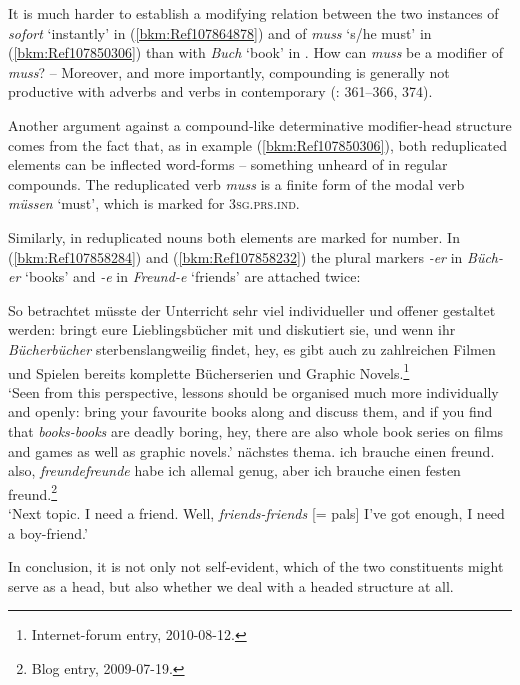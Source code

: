\documentclass[output=paper
  ,nobabel
  ,draftmode
  ,colorlinks, citecolor=brown
]{langscibook}
\begin{document}
\noindent
It is much harder to establish a modifying relation between the two instances of \emph{sofort}
`instantly' in (\ref{bkm:Ref107864878}) and of \emph{muss} `s/he must' in (\ref{bkm:Ref107850306})
than with \emph{Buch} `book' in . How can \emph{muss} be a modifier of \emph{muss}?
– Moreover, and more importantly, compounding is generally not productive with adverbs and verbs
in contemporary  (\citealt{FleischerBarz2012}: 361–366, 374).

Another argument against a compound-like determinative modifier-head structure comes from the fact
that, as in example (\ref{bkm:Ref107850306}), both reduplicated elements can be inflected word-forms
– something unheard of in regular compounds. The reduplicated verb \emph{muss} is a finite form of
the modal verb \emph{müssen} `must', which is marked for 3\textsc{sg.prs.ind}.

Similarly, in reduplicated nouns both elements are marked for number. In (\ref{bkm:Ref107858284})
and (\ref{bkm:Ref107858232}) the plural markers \emph{-er} in \emph{Büch-er} `books' and
\emph{-e} in \emph{Freund-e} `friends' are attached twice:



\ea
\label{bkm:Ref107858284}%
So betrachtet müsste der Unterricht sehr viel individueller und offener gestaltet werden: bringt eure Lieblingsbücher mit und diskutiert sie, und wenn ihr \emph{Bücherbücher} sterbenslangweilig findet, hey, es gibt auch zu zahlreichen Filmen und Spielen bereits komplette Bücherserien und Graphic Novels.\footnote{Internet-forum entry, 2010-08-12.}\\
`Seen from this perspective, lessons should be organised much more individually and openly: bring your favourite books along and discuss them, and if you find that \emph{books-books} are deadly boring, hey, there are also whole book series on films and games as well as graphic novels.'
\z
\ea
\label{bkm:Ref107858232}%
nächstes thema. ich brauche einen freund. also, \emph{freundefreunde} habe ich allemal genug, aber ich brauche einen festen freund.\footnote{
Blog entry, 2009-07-19.}\\
`Next topic. I need a friend. Well, \emph{friends-friends} [= pals] I've got enough, I need a boy-friend.'
\z

\noindent
In conclusion, it is not only not self-evident, which of the two constituents might serve as a head,
but also whether we deal with a headed structure at all.
\end{document}
